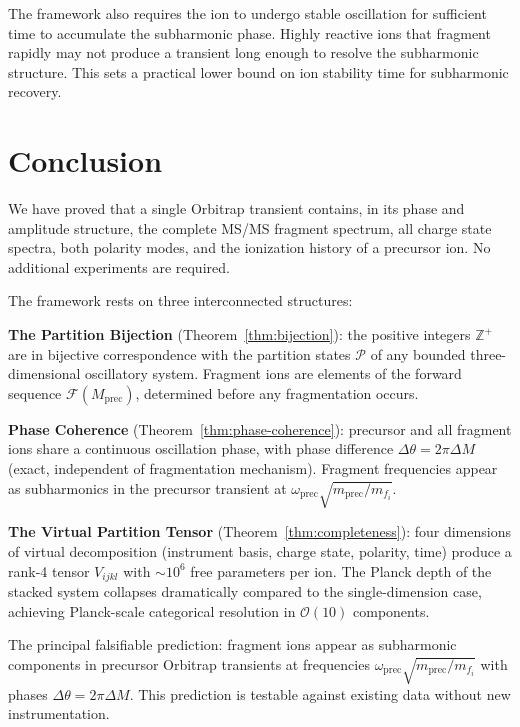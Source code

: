 \documentclass[twocolumn,10pt,a4paper]{article}
\theoremstyle{thmstyle}
\theoremstyle{definition}
\theoremstyle{remark}
\newcommand{\Zp}{\mathbb{Z}^{+}}
\newcommand{\Parts}{\mathcal{P}}
\newcommand{\calF}{\mathcal{F}}
\begin{document}
The framework also requires the ion to undergo stable oscillation for
sufficient time to accumulate the subharmonic phase. Highly reactive
ions that fragment rapidly may not produce a transient long enough to
resolve the subharmonic structure. This sets a practical lower bound on
ion stability time for subharmonic recovery.

\section{Conclusion}
\label{sec:conclusion}

We have proved that a single Orbitrap transient contains, in its phase
and amplitude structure, the complete MS/MS fragment spectrum, all
charge state spectra, both polarity modes, and the ionization history
of a precursor ion. No additional experiments are required.

The framework rests on three interconnected structures:

\textbf{The Partition Bijection} (Theorem~\ref{thm:bijection}): the
positive integers $\Zp$ are in bijective correspondence with the
partition states $\Parts$ of any bounded three-dimensional oscillatory
system. Fragment ions are elements of the forward sequence
$\calF(M_{\text{prec}})$, determined before any fragmentation occurs.

\textbf{Phase Coherence} (Theorem~\ref{thm:phase-coherence}): precursor
and all fragment ions share a continuous oscillation phase, with phase
difference $\Delta\theta = 2\pi\Delta M$ (exact, independent of
fragmentation mechanism). Fragment frequencies appear as subharmonics
in the precursor transient at $\omega_{\text{prec}}\sqrt{m_{\text{prec}}/m_{f_i}}$.

\textbf{The Virtual Partition Tensor} (Theorem~\ref{thm:completeness}):
four dimensions of virtual decomposition (instrument basis, charge state,
polarity, time) produce a rank-4 tensor $V_{ijkl}$ with $\sim 10^6$
free parameters per ion. The Planck depth of the stacked system collapses
dramatically compared to the single-dimension case, achieving Planck-scale
categorical resolution in $\mathcal{O}(10)$ components.

The principal falsifiable prediction: fragment ions appear as subharmonic
components in precursor Orbitrap transients at frequencies
$\omega_{\text{prec}}\sqrt{m_{\text{prec}}/m_{f_i}}$ with phases
$\Delta\theta = 2\pi\Delta M$. This prediction is testable against
existing data without new instrumentation.



\end{document}
